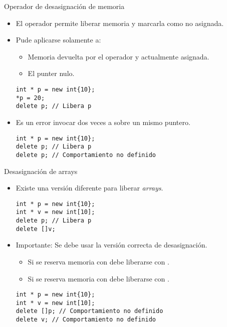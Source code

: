 \begin{frame}[fragile]{Operador de desasignación de memoria}
\begin{itemize}
  \item El operador  permite liberar memoria y marcarla como no asignada.
  \item Pude aplicarse solamente a:
    \begin{itemize}
      \item Memoria devuelta por el operador  y actualmente asignada.
      \item El punter nulo.
    \end{itemize}
\begin{lstlisting}
int * p = new int{10};
*p = 20;
delete p; // Libera p
\end{lstlisting}
  \item Es un error invocar dos veces a  sobre un mismo puntero.
\begin{lstlisting}
int * p = new int{10};
delete p; // Libera p
delete p; // Comportamiento no definido
\end{lstlisting}
\end{itemize}
\end{frame}

\begin{frame}[fragile]{Desasignación de arrays}
\begin{itemize}
  \item Existe una versión diferente para liberar \emph{arrays}.
\begin{lstlisting}
int * p = new int{10};
int * v = new int[10];
delete p; // Libera p
delete []v;
\end{lstlisting}
  \item \alert{Importante}: Se debe usar la versión correcta de desasignación.
    \begin{itemize}
      \item Si se reserva memoria con  debe liberarse con .
      \item Si se reserva memoria con  debe liberarse con .
    \end{itemize}
\begin{lstlisting}
int * p = new int{10};
int * v = new int[10];
delete []p; // Comportamiento no definido
delete v; // Comportamiento no definido
\end{lstlisting}
\end{itemize}
\end{frame}

